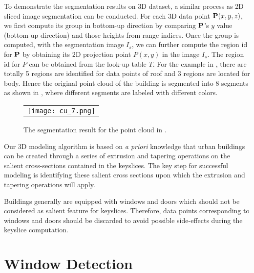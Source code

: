 To demonstrate the segmentation results on 3D dataset,
a similar process as 2D sliced image segmentation can be conducted.
For each 3D data point ${\bf P}(x, y, z)$,
we first compute its group in bottom-up direction
by comparing ${\bf P}$'s $y$ value (bottom-up direction) and
those heights from range indices.
%
Once the group is computed, with the segmentation image $I_s$,
we can further compute the region id for ${\bf P}$ by
obtaining its 2D projection point $P(x, y)$ in the image $I_s$.
The region id for $P$ can be obtained from the look-up table $T$.
For the example in ,
there are totally 5 regions are identified for data points of roof
and 3 regions are located for body.
Hence the original point cloud of the building is
segmented into 8 segments as shown in ,
where different segments are labeled with different colors.

\begin{figure} [htbp]
\begin{center}
\begin{tabular}{c}
\texttt{[image: cu\_7.png]}
\end{tabular}
\end{center}
\caption{The segmentation result for the point cloud in .}
\label{fig:DS_Fig2}
\end{figure}



\label{sec:reconst}
Our 3D modeling algorithm is based on \emph{a priori} knowledge that
urban buildings can be created through a series of extrusion and tapering
operations on the salient cross-sections contained in the keyslices.
The key step for successful modeling is identifying these salient cross
sections upon which the extrusion and tapering operations will apply.

Buildings generally are equipped with windows and doors which should not
be considered as salient feature for keyslices.
Therefore, data points corresponding to windows and doors
should be discarded to avoid possible side-effects
during the keyslice computation.

\section{Window Detection}
\label{sec:wdd}

